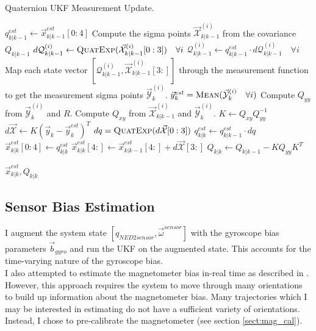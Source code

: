 \documentclass[conference]{IEEEtran}
\begin{document}
\begin{algorithm}
  \caption{Quaternion UKF Measurement Update.}
  \label{alg:updatemeas}
  \begin{algorithmic}
      \State $q_{k|k-1}^{est} \gets \vec{x}_{k|k-1}^{est}[0:4]$
      \State Compute the sigma points $\vec{\mathcal{X}}^{(i)}_{k|k-1}$ from the covariance $Q_{k|k-1}$
      \State $d\mathcal{Q}^{(i)}_{k|k-1} \gets \textproc{QuatExp}(\vec{\mathcal{X}}^{(i)}_{k|k-1}[0:3]) \quad \forall i$
      \State $\mathcal{Q}^{(i)}_{k|k-1} \gets q_{k|k-1}^{est} \cdot d\mathcal{Q}^{(i)}_{k|k-1} \quad \forall i$
      \State Map each state vector $[\mathcal{Q}^{(i)}_{k|k-1}, \vec{\mathcal{X}}^{(i)}_{k|k-1}[3:]]$ through the measurement function to get the measurement sigma points $\vec{\mathcal{Y}}^{(i)}_{k}$.
      \State $\vec{y}^{est}_{k} = \textproc{Mean}(\vec{\mathcal{Y}}^{(i)}_{k} \quad \forall i)$
      \State Compute $Q_{yy}$ from $\vec{\mathcal{Y}}^{(i)}_{k}$ and $R$.
      \State Compute $Q_{xy}$ from $\vec{\mathcal{X}}^{(i)}_{k|k-1}$ and $\vec{\mathcal{Y}}^{(i)}_{k}$.
      \State $K \gets Q_{xy} Q_{yy}^{-1}$
      \State $d\vec{\mathcal{X}} \gets K (\vec{y}_{k} - \vec{y}^{est}_{k})^T$
      \State $dq = \textproc{QuatExp}(d\vec{\mathcal{X}}[0:3])$
      \State $q_{k|k}^{est} \gets q_{k|k-1}^{est} \cdot dq$
      \State $\vec{x}^{est}_{k|k}[0:4] \gets q_{k|k}^{est}$
      \State $\vec{x}^{est}_{k|k}[4:] \gets \vec{x}^{est}_{k|k-1}[4:] + d\vec{\mathcal{X}}[3:]$
      \State $Q_{k|k} \gets Q_{k|k-1} - K Q_{yy} K^T$

      \Return $\vec{x}_{k|k}^{est}, Q_{k|k}$
    \EndFunction
  \end{algorithmic}
\end{algorithm}

\subsection{Sensor Bias Estimation}
I augment the system state $[q_{NED2sensor}, \vec{\omega}^{sensor}]$ with the gyroscope bias parameters $\vec{b}_{gyro}$ and run the UKF on the augmented state. This accounts for the time-varying nature of the gyroscope bias.\\
I also attempted to estimate the magnetometer bias in-real time as described in \cite{Crassidis2005}. However, this approach requires the system to move through many orientations to build up information about the magnetometer bias. Many trajectories which I may be interested in estimating do not have a sufficient variety of orientations. Instead, I chose to pre-calibrate the magnetometer (see section \ref{sect:mag_cal}).
\end{document}
